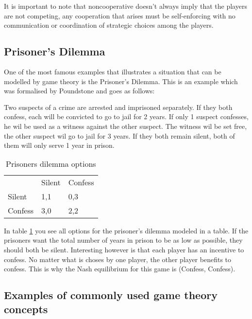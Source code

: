 It is important to note that noncooperative doesn't always imply that the players are not competing, any cooperation that arises must be self-enforcing with no communication or coordination of strategic choices among the players.\cite{keypaper}

\subsection{Prisoner's Dilemma}
One of the most famous examples that illustrates a situation that can be modelled by game theory is the Prisoner's Dilemma. This is an example which was formalised by Poundstone \cite{poundstone} and goes as follows: 

Two suspects of a crime are arrested and imprisoned separately. If they both confess, each will be convicted to go to jail for 2 years. If only 1 suspect confesses, he wil be used as a witness against the other suspect. The witness wil be set free, the other suspect wil go to jail for 3 years. If they both remain silent, both of them will only serve 1 year in prison.

\begin{table}[h]
\centering
\begin{tabular}{lll}
 & Silent & Confess \\ \cline{2-3} 
\multicolumn{1}{l|}{Silent} & \multicolumn{1}{l|}{1,1} & \multicolumn{1}{l|}{0,3} \\ \cline{2-3} 
\multicolumn{1}{l|}{Confess} & \multicolumn{1}{l|}{3,0} & \multicolumn{1}{l|}{2,2} \\ \cline{2-3} 
\end{tabular}
\caption{Prisoners dilemma options}
\label{prisoners-d}
\end{table}

In table \ref{prisoners-d} you see all options for the prisoner's dilemma modeled in a table. If the prisoners want the total number of years in prison to be as low as possible, they should both be silent. Interesting however is that each player has an incentive to confess. No matter what is choses by one player, the other player benefits to confess. This is why the Nash equilibrium for this game is (Confess, Confess).    

\subsection{Examples of commonly used game theory concepts}
